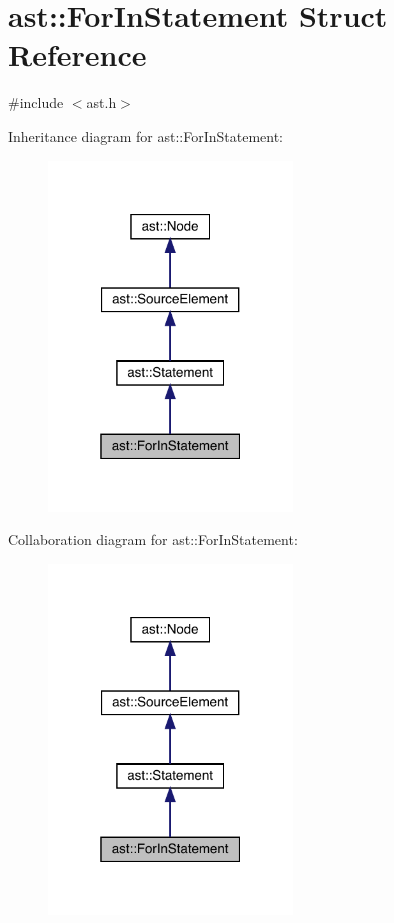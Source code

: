 \hypertarget{structast_1_1_for_in_statement}{}\section{ast\+:\+:For\+In\+Statement Struct Reference}
\label{structast_1_1_for_in_statement}


{\ttfamily \#include $<$ast.\+h$>$}



Inheritance diagram for ast\+:\+:For\+In\+Statement\+:\nopagebreak
\begin{figure}[H]
\begin{center}
\leavevmode
\includegraphics[width=184pt]{structast_1_1_for_in_statement__inherit__graph}
\end{center}
\end{figure}


Collaboration diagram for ast\+:\+:For\+In\+Statement\+:\nopagebreak
\begin{figure}[H]
\begin{center}
\leavevmode
\includegraphics[width=184pt]{structast_1_1_for_in_statement__coll__graph}
\end{center}
\end{figure}
